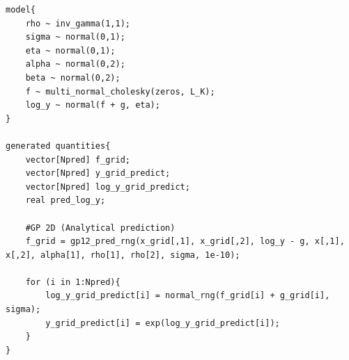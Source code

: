\documentclass{article}
\begin{document}
\begin{verbatim}
model{
	rho ~ inv_gamma(1,1);
	sigma ~ normal(0,1);
    eta ~ normal(0,1);
	alpha ~ normal(0,2);
    beta ~ normal(0,2);    
    f ~ multi_normal_cholesky(zeros, L_K);
    log_y ~ normal(f + g, eta);
}

generated quantities{
	vector[Npred] f_grid;
	vector[Npred] y_grid_predict;
	vector[Npred] log_y_grid_predict;
    real pred_log_y;

	#GP 2D (Analytical prediction)
	f_grid = gp12_pred_rng(x_grid[,1], x_grid[,2], log_y - g, x[,1], x[,2], alpha[1], rho[1], rho[2], sigma, 1e-10);
    
	for (i in 1:Npred){
		log_y_grid_predict[i] = normal_rng(f_grid[i] + g_grid[i], sigma); 
        y_grid_predict[i] = exp(log_y_grid_predict[i]);
	}
}
\end{verbatim}
\end{document}
